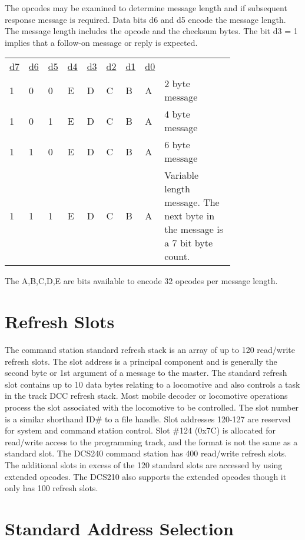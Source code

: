 The opcodes may be examined to determine message length and if subsequent response message is required. Data bits d6 and d5 encode the message length. The message length includes the opcode and the checksum bytes. The bit d3 = 1 implies that a follow-on message or reply is expected.

\begin{tabular}{p{0.05\linewidth} p{0.05\linewidth}  p{0.05\linewidth}  p{0.05\linewidth}  p{0.05\linewidth}  p{0.05\linewidth}  p{0.05\linewidth}  p{0.05\linewidth} p{0.36\linewidth}} 
\underline{d7} & \underline{d6} & \underline{d5} & \underline{d4} & \underline{d3} & \underline{d2} & \underline{d1} & \underline{d0} & \\
1 & 0 & 0 & E & D & C & B & A & 2 byte message\\
1 & 0 & 1 & E & D & C & B & A & 4 byte message\\
1 & 1 & 0 & E & D & C & B & A & 6 byte message\\
1 & 1 & 1 & E & D & C & B & A & Variable length message. The next byte in the message is a 7 bit byte count.\\
\end{tabular}

The A,B,C,D,E are bits available to encode 32 opcodes per message length.

\section{Refresh Slots}
The command station standard refresh stack is an array of up to 120 read/write refresh slots. The slot address is a principal component and is generally the second byte or 1st argument of a message to the master. The standard refresh slot contains up to 10 data bytes relating to a locomotive and also controls a task in the track DCC refresh stack. Most mobile decoder or locomotive operations process the slot associated with the locomotive to be controlled. The slot number is a similar shorthand ID\# to a file handle. Slot addresses 120-127 are reserved for system and command station control. Slot \#124 (0x7C) is allocated for read/write access to the programming track, and the format is not the same as a standard slot. The DCS240 command station has 400 read/write refresh slots. The additional slots in excess of the 120 standard slots are accessed by using extended opcodes. The DCS210 also supports the extended opcodes though it only has 100 refresh slots.

\section{Standard Address Selection}

